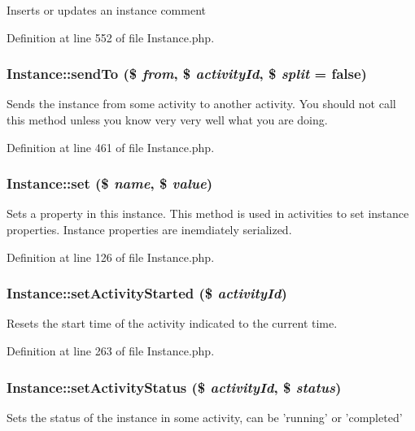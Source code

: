 Inserts or updates an instance comment 

Definition at line 552 of file Instance.php.
\subsubsection{\setlength{\rightskip}{0pt plus 5cm}Instance::send\-To (\$ {\em from}, \$ {\em activity\-Id}, \$ {\em split} = false)}\label{classInstance_a25}


Sends the instance from some activity to another activity. You should not call this method unless you know very very well what you are doing. 

Definition at line 461 of file Instance.php.
\subsubsection{\setlength{\rightskip}{0pt plus 5cm}Instance::set (\$ {\em name}, \$ {\em value})}\label{classInstance_a4}


Sets a property in this instance. This method is used in activities to set instance properties. Instance properties are inemdiately serialized. 

Definition at line 126 of file Instance.php.
\subsubsection{\setlength{\rightskip}{0pt plus 5cm}Instance::set\-Activity\-Started (\$ {\em activity\-Id})}\label{classInstance_a17}


Resets the start time of the activity indicated to the current time. 

Definition at line 263 of file Instance.php.
\subsubsection{\setlength{\rightskip}{0pt plus 5cm}Instance::set\-Activity\-Status (\$ {\em activity\-Id}, \$ {\em status})}\label{classInstance_a15}


Sets the status of the instance in some activity, can be 'running' or 'completed' 


